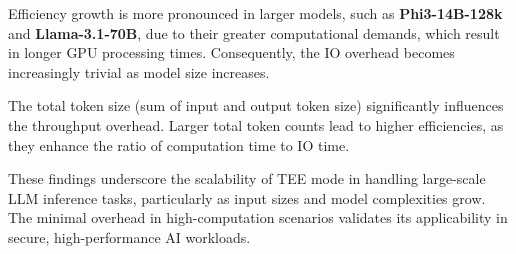 \documentclass{article}
\begin{document}
Efficiency growth is more pronounced in larger models, such as \textbf{Phi3-14B-128k} and \textbf{Llama-3.1-70B}, due to their greater computational demands, which result in longer GPU processing times. Consequently, the IO overhead becomes increasingly trivial as model size increases.

The total token size (sum of input and output token size) significantly influences the throughput overhead. Larger total token counts lead to higher efficiencies, as they enhance the ratio of computation time to IO time.

These findings underscore the scalability of TEE mode in handling large-scale LLM inference tasks, particularly as input sizes and model complexities grow. The minimal overhead in high-computation scenarios validates its applicability in secure, high-performance AI workloads.




\end{document}
